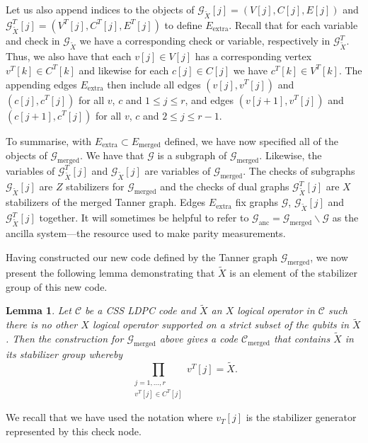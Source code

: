 \documentclass[reprint,
superscriptaddress,
 amsmath,amssymb,
 aps, longbibliography
]{revtex4-1}
\newtheorem{lemma}{Lemma}
\begin{document}
Let us also append indices to the objects of $\mathcal{G}_{\tilde{X}}[j] = (V[j],C[j], E[j])$ and $\mathcal{G}^{T}_{\tilde{X}}[j] = (V^{T}[j],C^{T}[j], E^{T}[j])$ to define $E_{\textrm{extra}}$. Recall that for each variable and check in $\mathcal{G}_{\tilde{X}}$ we have a corresponding check or variable, respectively in $\mathcal{G}^{T}_{\tilde{X}}$. Thus, we also have that each $v[j] \in V[j]$ has a corresponding vertex $v^T[k] \in C^{T}[k]$ and likewise for each $c[j] \in C[j]$ we have $c^T[k] \in V^{T}[k]$. The appending edges $E_{\textrm{extra}}$ then include all edges $( v[j], v^T[j])$ and $(c[j], c^{T}[j])$ for all $v$, $c$ and $1 \le j \le r$, and edges $( v[j+1], v^T[j])$ and $(c[j+1], c^{T}[j])$ for all $v$, $c$ and $ 2 \le j \le r-1 $. 

To summarise, with $E_\textrm{extra} \subset E_\textrm{merged}$ defined, we have now specified all of the objects of $\mathcal{G}_{\textrm{merged}}$. We have that $\mathcal{G}$ is a subgraph of $\mathcal{G}_{\textrm{merged}}$. Likewise, the variables of $\mathcal{G}^{T}_{\tilde{X}}[j]$ and $\mathcal{G}_{\tilde{X}}[j]$ are variables of $\mathcal{G}_{\textrm{merged}}$. The checks of subgraphs $\mathcal{G}_{\tilde{X}}[j]$ are $Z$ stabilizers for $\mathcal{G}_{\textrm{merged}}$ and the checks of dual graphs $\mathcal{G}_{\tilde{X}}^{T}[j]$ are $X$ stabilizers of the merged Tanner graph. Edges $E_\textrm{extra}$ fix graphs $\mathcal{G}$, $\mathcal{G}_{\tilde{X}}[j]$ and $\mathcal{G}^{T}_{\tilde{X}}[j]$ together. It will sometimes be helpful to refer to $\mathcal{G}_\textrm{anc} = \mathcal{G}_\textrm{merged} \backslash \mathcal{G}$ as the ancilla system---the resource used to make parity measurements.



Having constructed our new code defined by the Tanner graph $\mathcal{G}_\textrm{merged}$, we now present the following lemma demonstrating that $\tilde{X}$ is an element of the stabilizer group of this new code. 



\begin{lemma} \label{lemma:merge}
Let $\mathcal{C}$ be a CSS LDPC code and $\tilde{X}$ an $X$ logical operator in $\mathcal{C}$ such there is no other $X$ logical operator supported on a strict subset of the qubits in $\tilde{X}$. 
Then the construction for $\mathcal{G}_\textrm{merged}$ above gives a code $\mathcal{C}_{\textrm{merged}}$ that contains $\tilde{X}$ in its stabilizer group whereby
\begin{equation}
    \prod_{\substack{ j = 1,  \ldots , r \\ v^T[j]\in C^T[j]}} v^T[j] = \tilde{X}. 
\end{equation}
\end{lemma}
\noindent
We recall that we have used the notation where $v_T[j]$ is the stabilizer generator represented by this check node.
\end{document}
